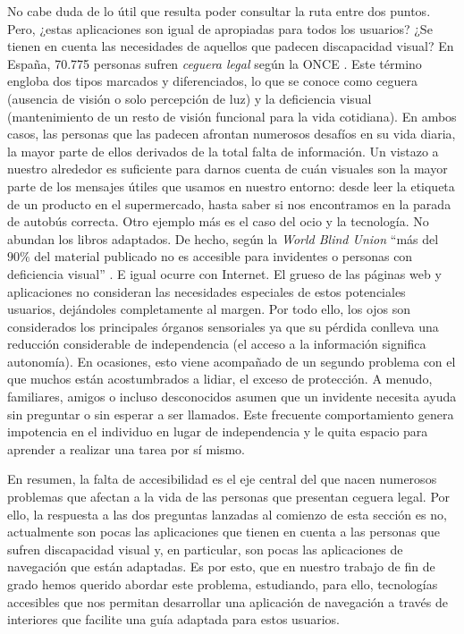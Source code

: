 No cabe duda de lo útil que resulta poder consultar la ruta entre dos puntos. Pero, ¿estas aplicaciones son igual de apropiadas para todos los usuarios? ¿Se tienen en cuenta las necesidades de aquellos que padecen discapacidad visual? En España, 70.775 personas sufren \textit{ceguera legal} según la ONCE \citep{informeceguera}. Este término engloba dos tipos marcados y diferenciados, lo que se conoce como ceguera (ausencia de visión o solo percepción de luz) y la deficiencia visual (mantenimiento de un resto de visión funcional para la vida cotidiana). En ambos casos, las personas que las padecen afrontan numerosos desafíos en su vida diaria, la mayor parte de ellos derivados de la total falta de información. Un vistazo a nuestro alrededor es suficiente para darnos cuenta de cuán visuales son la mayor parte de los mensajes útiles que usamos en nuestro entorno: desde leer la etiqueta de un producto en el supermercado, hasta saber si nos encontramos en la parada de autobús correcta. Otro ejemplo más es el caso del ocio y la tecnología. No abundan los libros adaptados. De hecho, según la \textit{World Blind Union} ``más del $90\%$ del material publicado no es accesible para invidentes o personas con deficiencia visual'' \citep{envision}. E igual ocurre con Internet. El grueso de las páginas web y aplicaciones no consideran las necesidades especiales de estos potenciales usuarios, dejándoles completamente al margen. Por todo ello, los ojos son considerados los principales órganos sensoriales ya que su pérdida conlleva una reducción considerable de independencia (el acceso a la información significa autonomía). En ocasiones, esto viene acompañado de un segundo problema con el que muchos están acostumbrados a lidiar, el exceso de protección. A menudo, familiares, amigos o incluso desconocidos asumen que un invidente necesita ayuda sin preguntar o sin esperar a ser llamados. Este frecuente comportamiento genera impotencia en el individuo en lugar de independencia y le quita espacio para aprender a realizar una tarea por sí mismo. 

En resumen, la falta de accesibilidad es el eje central del que nacen numerosos problemas que afectan a la vida de las personas que presentan ceguera legal. Por ello, la respuesta a las dos preguntas lanzadas al comienzo de esta sección es no, actualmente son pocas las aplicaciones que tienen en cuenta a las personas que sufren discapacidad visual y, en particular, son pocas las aplicaciones de navegación que están adaptadas. Es por esto, que en nuestro trabajo de fin de grado hemos querido abordar este problema, estudiando, para ello, tecnologías accesibles que nos permitan desarrollar una aplicación de navegación a través de interiores que facilite una guía adaptada para estos usuarios.

